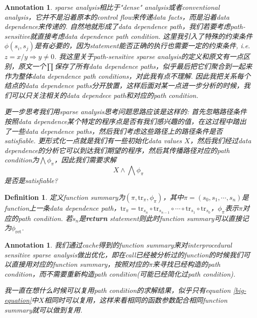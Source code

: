\documentclass{article}
\newtheorem{definition}[theorem]{Definition}
\newtheorem{annotation}[theorem]{Annotation}
\begin{document}
\begin{annotation}
\rm sparse analysis相比于"dense" analysis或者conventional analysis，它并不是沿着原本的control flow来传递data facts，而是沿着data dependence来传递的. 自然地就形成了data dependence path，我们若要考虑path-sensitive就直接考虑data dependence path condition. 这里我引入了特殊的约束条件$\phi(s_i,s_j)$是有必要的，因为statement能否正确的执行也需要一定的约束条件, i.e. $z = x/y \Rightarrow y \neq 0$. 我这里关于path-sensitive sparse analysis的定义和原文有一点区别，原文一个$\prod$保存了所有data dependence paths，似乎最后把它们聚合到一起来作为整体data dependence path conditions，对此我有点不理解. 因此我把关系每个结点的data dependence paths分开放置，这样后面对某一点进一步分析的时候，我们可以只关注相关的data dependece path和对应的path condition. 


更一步思考我们用sparse analysis思考问题思路应该是这样的: 首先忽略路径条件按照data dependence某个特定的程序点是否有我们感兴趣的值，在这过程中踏出了一些data dependence paths，然后我们考虑这些路径上的路径条件是否satisfiable. 更形式化一点就是我们有一些初始化data values $X$，然后我们经过data dependence的分析它可以到达我们期望的程序，然后其传播路径对应的path condition为$\bigwedge \phi_\pi$，因此我们需要求解
\begin{equation}\label{big-equation}
X \wedge \bigwedge \phi_\pi
\end{equation}
是否是satisfiable?
\end{annotation}

\begin{definition}
\rm 定义function summary为$(\pi, \text{tr}_\pi,\phi_\pi)$，其中$\pi=(s_0,s_1,\cdots,s_n)$是function上一条data dependence path，$\text{tr}_\pi = \text{tr}_{s_n} \circ \text{tr}_{s_{n-1}} \circ \cdots \circ \text{tr}_{s_1} \circ \text{tr}_{s_0}$，$\phi_\pi$表示$\pi$对应的path condition. 若$s_n$是\textbf{return} statement则此时function summary可以直接记为$\phi_{\text{ret}}$. 
\end{definition}

\begin{annotation}
\rm 我们通过cache得到的function summary来对interprocedural sensitive sparse analysis做出优化，即在call已经被分析过的function的时候我们可以直接用对应的function summary，按照对应的$\pi$来寻找已经构造的path condition，而不需要重新构造path condition(可能已经简化过path condition).

我一直在想什么时候可以复用path condition的求解结果，似乎只有equation \ref{big-equation}中$X$相同时可以复用，这样来看相同的函数参数配合相同function summary就可以做到复用. 
\end{annotation}
\end{document}
